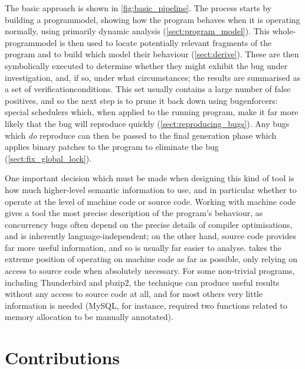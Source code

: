 The basic approach is shown in \autoref{fig:basic_pipeline}.  The
process starts by building a \gls{programmodel}, showing how the
program behaves when it is operating normally, using primarily dynamic
analysis (\autoref{sect:program_model}).  This
whole-\gls{programmodel} is then used to locate potentially relevant
fragments of the program and to build {\StateMachines} which model
their behaviour (\autoref{sect:derive}).  These {\StateMachines} are
then symbolically executed to determine
whether they might exhibit the bug under investigation, and, if so,
under what circumstances; the results are summarised as a set of
\glspl{verificationcondition}.  This set usually contains a large
number of false positives, and so the next step is to prune it back
down using \glspl{bugenforcer}: special schedulers which, when applied
to the running program, make it far more likely that the bug will
reproduce quickly (\autoref{sect:reproducing_bugs}).  Any bugs which
\emph{do} reproduce can then be passed to the final {\genfix}
generation phase which applies binary patches to the program to
eliminate the bug (\autoref{sect:fix_global_lock}).

One important decision which must be made when designing this kind of
tool is how much higher-level semantic information to use, and in
particular whether to operate at the level of machine code or source
code.  Working with machine code gives a tool the most precise
description of the program's behaviour, as concurrency bugs often
depend on the precise details of compiler optimisations, and is
inherently language-independent; on the other hand, source code
provides far more useful information, and so is usually far easier to
analyse.  {\Technique} takes the extreme position of operating on
machine code as far as possible, only relying on access to source code
when absolutely necessary.  For some non-trivial programs, including
Thunderbird and pbzip2, the technique can produce useful results
without any access to source code at all, and for most others very
little information is needed (MySQL, for instance, required two
functions related to memory allocation to be manually annotated).

\section{Contributions}

